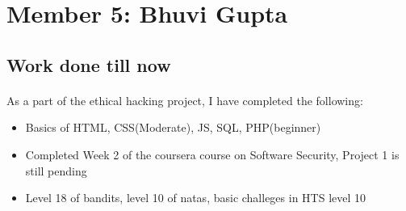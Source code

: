 \documentclass{article}
\begin{document}
\section*{Member 5: Bhuvi Gupta}
\subsection*{Work done till now}
\paragraph{}
As a part of the ethical hacking project, I have completed the following:
\begin{itemize}
    \item Basics of HTML, CSS(Moderate), JS, SQL, PHP(beginner)
    \item Completed Week 2 of the coursera course on Software Security, Project 1 is still pending
    \item Level 18 of bandits, level 10 of natas, basic challeges in HTS level 10
\end{itemize}
\end{document}
